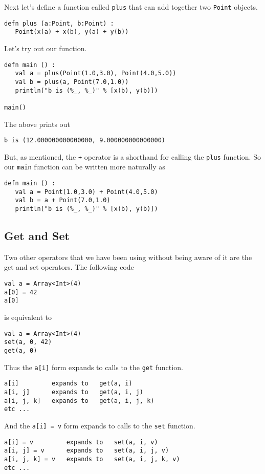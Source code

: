 \documentclass[10pt,oneside]{book}
\begin{document}
Next let's define a function called \texttt{\frenchspacing plus} that can add together two \texttt{\frenchspacing Point} objects.
\begin{lstlisting}
defn plus (a:Point, b:Point) :
   Point(x(a) + x(b), y(a) + y(b))
\end{lstlisting}

Let's try out our function.
\begin{lstlisting}
defn main () :
   val a = plus(Point(1.0,3.0), Point(4.0,5.0))
   val b = plus(a, Point(7.0,1.0))
   println("b is (%_, %_)" % [x(b), y(b)])

main()
\end{lstlisting}
The above prints out
\begin{lstlisting}
b is (12.000000000000000, 9.000000000000000)
\end{lstlisting}

But, as mentioned, the \texttt{\frenchspacing +} operator is a shorthand for calling the \texttt{\frenchspacing plus} function. So our \texttt{\frenchspacing main} function can be written more naturally as
\begin{lstlisting}
defn main () :
   val a = Point(1.0,3.0) + Point(4.0,5.0)
   val b = a + Point(7.0,1.0)
   println("b is (%_, %_)" % [x(b), y(b)])
\end{lstlisting}

\subsection*{Get and Set}
Two other operators that we have been using without being aware of it are the get and set operators. The following code
\begin{lstlisting}
val a = Array<Int>(4)
a[0] = 42
a[0]
\end{lstlisting}
is equivalent to
\begin{lstlisting}
val a = Array<Int>(4)
set(a, 0, 42)
get(a, 0)
\end{lstlisting}

Thus the \texttt{\frenchspacing a[i]} form expands to calls to the \texttt{\frenchspacing get} function.
\begin{lstlisting}
a[i]         expands to   get(a, i)
a[i, j]      expands to   get(a, i, j)
a[i, j, k]   expands to   get(a, i, j, k)
etc ...
\end{lstlisting}
And the \texttt{\frenchspacing a[i] = v} form expands to calls to the \texttt{\frenchspacing set} function.
\begin{lstlisting}
a[i] = v         expands to   set(a, i, v)
a[i, j] = v      expands to   set(a, i, j, v)
a[i, j, k] = v   expands to   set(a, i, j, k, v)
etc ...
\end{lstlisting}
\end{document}
